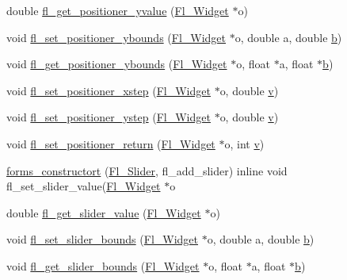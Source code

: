 \begin{DoxyCompactItemize}
\item 
double \hyperlink{forms_8_h_a979bcb9062f967f7590991ff2edb2779}{fl\+\_\+get\+\_\+positioner\+\_\+yvalue} (\hyperlink{class_fl___widget}{Fl\+\_\+\+Widget} $\ast$o)
\item 
void \hyperlink{forms_8_h_a0f87aca908d981fcef75539c49b3d91a}{fl\+\_\+set\+\_\+positioner\+\_\+ybounds} (\hyperlink{class_fl___widget}{Fl\+\_\+\+Widget} $\ast$o, double a, double \hyperlink{forms_8_h_a0ba06a290a384fa06b1b90745827dae2}{b})
\item 
void \hyperlink{forms_8_h_a5d82a4225259b4cd48fa58bcc8f33ce4}{fl\+\_\+get\+\_\+positioner\+\_\+ybounds} (\hyperlink{class_fl___widget}{Fl\+\_\+\+Widget} $\ast$o, float $\ast$a, float $\ast$\hyperlink{forms_8_h_a0ba06a290a384fa06b1b90745827dae2}{b})
\item 
void \hyperlink{forms_8_h_a0fcb9aa67b89bf7bcacbe81fb31f44b4}{fl\+\_\+set\+\_\+positioner\+\_\+xstep} (\hyperlink{class_fl___widget}{Fl\+\_\+\+Widget} $\ast$o, double \hyperlink{forms_8_h_a3b90d5a73541ab9402511d87bed076ef}{v})
\item 
void \hyperlink{forms_8_h_a9f4fd030f9ffbf392222684c7bd3b549}{fl\+\_\+set\+\_\+positioner\+\_\+ystep} (\hyperlink{class_fl___widget}{Fl\+\_\+\+Widget} $\ast$o, double \hyperlink{forms_8_h_a3b90d5a73541ab9402511d87bed076ef}{v})
\item 
void \hyperlink{forms_8_h_ae3fe41b8cdc1c90cb5ae66745b5349e8}{fl\+\_\+set\+\_\+positioner\+\_\+return} (\hyperlink{class_fl___widget}{Fl\+\_\+\+Widget} $\ast$o, int \hyperlink{forms_8_h_a3b90d5a73541ab9402511d87bed076ef}{v})
\item 
\hyperlink{forms_8_h_a8eac24d863b57042573cb40c5f527857}{forms\+\_\+constructort} (\hyperlink{class_fl___slider}{Fl\+\_\+\+Slider}, fl\+\_\+add\+\_\+slider) inline void fl\+\_\+set\+\_\+slider\+\_\+value(\hyperlink{class_fl___widget}{Fl\+\_\+\+Widget} $\ast$o
\item 
double \hyperlink{forms_8_h_a0207d08453353d5d60ffbdbcfbbbb22d}{fl\+\_\+get\+\_\+slider\+\_\+value} (\hyperlink{class_fl___widget}{Fl\+\_\+\+Widget} $\ast$o)
\item 
void \hyperlink{forms_8_h_a1a6b876fdf64a90227514c4b8931cdf1}{fl\+\_\+set\+\_\+slider\+\_\+bounds} (\hyperlink{class_fl___widget}{Fl\+\_\+\+Widget} $\ast$o, double a, double \hyperlink{forms_8_h_a0ba06a290a384fa06b1b90745827dae2}{b})
\item 
void \hyperlink{forms_8_h_ac48d961567bdfc323d50474ac6dc3bfa}{fl\+\_\+get\+\_\+slider\+\_\+bounds} (\hyperlink{class_fl___widget}{Fl\+\_\+\+Widget} $\ast$o, float $\ast$a, float $\ast$\hyperlink{forms_8_h_a0ba06a290a384fa06b1b90745827dae2}{b})

\end{DoxyCompactItemize}
